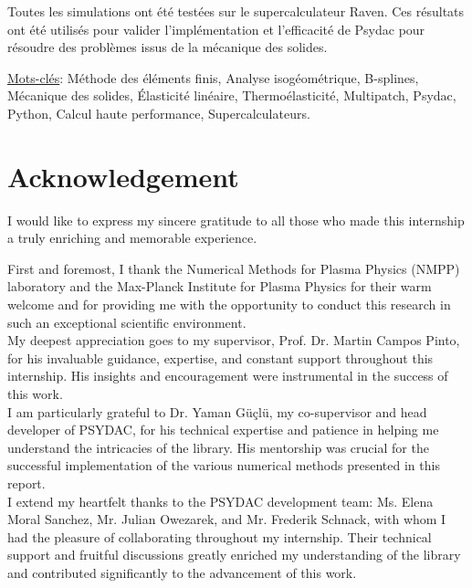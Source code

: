 \documentclass[a4paper,12pt,twoside]{report}
\begin{document}
Toutes les simulations ont été testées sur le supercalculateur Raven. Ces résultats ont été utilisés pour valider l'implémentation et l'efficacité de Psydac pour résoudre des problèmes issus de la mécanique des solides.

\vspace{0.4cm}

\underline{Mots-clés}: Méthode des éléments finis, Analyse isogéométrique, B-splines, Mécanique des solides, Élasticité linéaire, Thermoélasticité, Multipatch, Psydac, Python, Calcul haute performance, Supercalculateurs.

\newpage\null

\newpage

\section*{Acknowledgement}

I would like to express my sincere gratitude to all those who made this internship a truly enriching and memorable experience.

First and foremost, I thank the Numerical Methods for Plasma Physics (NMPP) laboratory and the Max-Planck Institute for Plasma Physics for their warm welcome and for providing me with the opportunity to conduct this research in such an exceptional scientific environment. \\

My deepest appreciation goes to my supervisor, Prof. Dr. Martin Campos Pinto, for his invaluable guidance, expertise, and constant support throughout this internship. His insights and encouragement were instrumental in the success of this work. \\

I am particularly grateful to Dr. Yaman Güçlü, my co-supervisor and head developer of PSYDAC, for his technical expertise and patience in helping me understand the intricacies of the library. His mentorship was crucial for the successful implementation of the various numerical methods presented in this report.\\

I extend my heartfelt thanks to the PSYDAC development team: Ms. Elena Moral Sanchez, Mr. Julian Owezarek, and Mr. Frederik Schnack, with whom I had the pleasure of collaborating throughout my internship. Their technical support and fruitful discussions greatly enriched my understanding of the library and contributed significantly to the advancement of this work. \\
\end{document}

